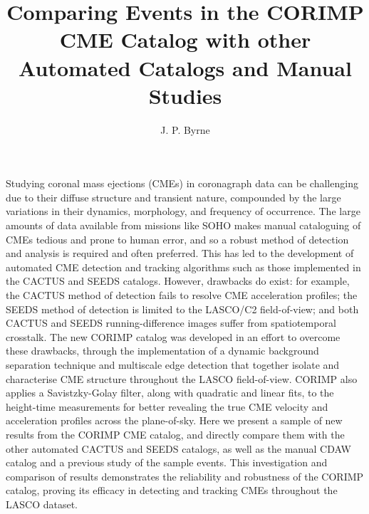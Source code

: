 \documentclass[referee,a4paper,12pt,traditabstract]{swsc}
\begin{document}
\begin{linenumbers}

   \title{Comparing Events in the CORIMP CME Catalog with other Automated Catalogs and Manual Studies}

   


   \author{J. P. Byrne}%



 
  \abstract
  {
  Studying coronal mass ejections (CMEs) in coronagraph data can be challenging due to their diffuse structure and transient nature, compounded by the large variations in their dynamics, morphology, and frequency of occurrence. The large amounts of data available from missions like SOHO makes manual cataloguing of CMEs tedious and prone to human error, and so a robust method of detection and analysis is required and often preferred. This has led to the development of automated CME detection and tracking algorithms such as those implemented in the CACTUS and SEEDS catalogs. However, drawbacks do exist: for example, the CACTUS method of detection fails to resolve CME acceleration profiles; the SEEDS method of detection is limited to the LASCO/C2 field-of-view; and both CACTUS and SEEDS running-difference images suffer from spatiotemporal crosstalk. The new CORIMP catalog was developed in an effort to overcome these drawbacks, through the implementation of a dynamic background separation technique and multiscale edge detection that together isolate and characterise CME structure throughout the LASCO field-of-view. CORIMP also applies a Savistzky-Golay filter, along with quadratic and linear fits, to the height-time measurements for better revealing the true CME velocity and acceleration profiles across the plane-of-sky. Here we present a sample of new results from the CORIMP CME catalog, and directly compare them with the other automated CACTUS and SEEDS catalogs, as well as the manual CDAW catalog and a previous study of the sample events. This investigation and comparison of results demonstrates the reliability and robustness of the CORIMP catalog, proving its efficacy in detecting and tracking CMEs throughout the LASCO dataset.
  }
  

\end{linenumbers}
\end{document}
